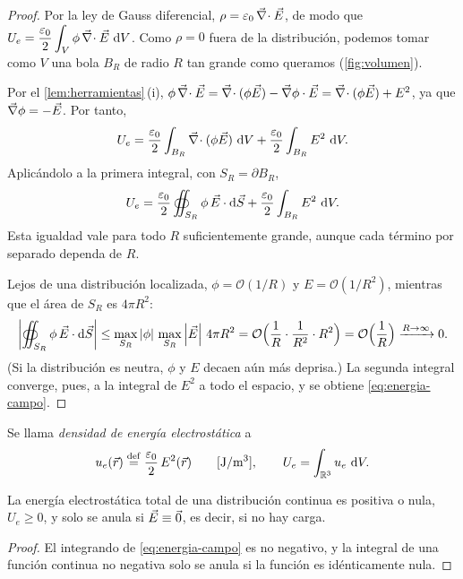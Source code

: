\begin{proof}
 Por la ley de Gauss diferencial, $\rho=\eo\,\divg\vE$, de modo que
$U_e=\dfrac{\eo}{2}\displaystyle\int_V\phi\,\divg\vE\,\dd V$. Como $\rho=0$ fuera de la distribución, podemos tomar como $V$ una bola $B_R$ de radio $R$
tan grande como queramos (\cref{fig:volumen}).

 Por el \cref{lem:herramientas}\,(i), $\phi\,\divg\vE=\divg(\phi\vE)-\grad\phi\cdot\vE=\divg(\phi\vE)+E^2$, ya que
$\grad\phi=-\vE$. Por tanto,
\[
  U_e=\frac{\eo}{2}\int_{B_R}\divg(\phi\vE)\,\dd V+\frac{\eo}{2}\int_{B_R}E^2\,\dd V .
\]
 Aplicándolo a la primera integral, con $S_R=\partial B_R$,
\[
  U_e=\frac{\eo}{2}\oiint_{S_R}\phi\,\vE\cdot\dS+\frac{\eo}{2}\int_{B_R}E^2\,\dd V .
\]
Esta igualdad vale para todo $R$ suficientemente grande, aunque cada término por separado dependa de $R$.

 Lejos de una distribución localizada, $\phi=\mathcal O(1/R)$ y $E=\mathcal O(1/R^2)$, mientras que el área de $S_R$ es $4\pi R^2$:
\[
  \abs{\oiint_{S_R}\phi\,\vE\cdot\dS}\leq\max_{S_R}\abs\phi\,\max_{S_R}\abs{\vE}\,4\pi R^2=\mathcal O\Big(\frac1R\cdot\frac{1}{R^2}\cdot R^2\Big)=\mathcal O\Big(\frac1R\Big)\xrightarrow{R\to\infty}0 .
\]
(Si la distribución es neutra, $\phi$ y $E$ decaen aún más deprisa.) La segunda integral converge, pues, a la integral de $E^2$ a todo el
espacio, y se obtiene \eqref{eq:energia-campo}.
\end{proof}



\begin{definicion}\label{def:densidad}
Se llama \emph{densidad de energía electrostática} a
\begin{equation}\label{eq:densidad}
  u_e(\vr)\defeq\frac{\eo}{2}\,E^2(\vr)\qquad[\si{J/m^3}],\qquad U_e=\int_{\mathbb R^3}u_e\,\dd V .
\end{equation}
\end{definicion}

\begin{corolario}[Positividad]\label{cor:positiva}
La energía electrostática total de una distribución continua es positiva o nula, $U_e\geq0$, y solo se anula si $\vE\equiv\vcero$, es decir, si
no hay carga.
\end{corolario}

\begin{proof}
El integrando de \eqref{eq:energia-campo} es no negativo, y la integral de una función continua no negativa solo se anula si la
función es idénticamente nula.
\end{proof}

